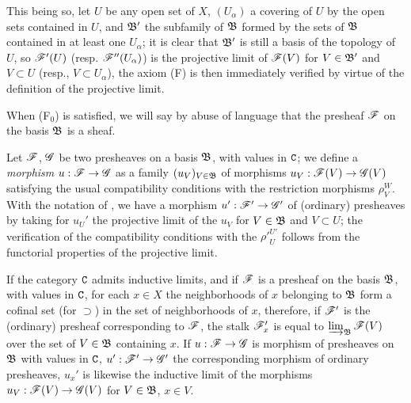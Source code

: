 \begin{env}[3.2.2]
This being so, let $U$ be any open set of $X$, $(U_\alpha)$ a covering of $U$ by
the open sets contained in $U$, and $\mathfrak{B}'$ the subfamily of
$\mathfrak{B}$ formed by the sets
of $\mathfrak{B}$ contained in at least one $U_\alpha$; it is clear that
$\mathfrak{B}'$ is still a basis of the topology of $U$, so $\mathscr{F}'(U)$
(resp. $\mathscr{F}''(U_\alpha)$) is the projective limit of $\mathscr{F}(V)$ for
$V\in\mathfrak{B}'$ and $V\subset U$ (resp., $V\subset U_\alpha$), the axiom (F)
is then immediately verified by virtue of the definition of the projective
limit.

When (F$_0$) is satisfied, we will say by abuse of language that the presheaf
$\mathscr{F}$ on the basis $\mathfrak{B}$ is a sheaf.
\end{env}

\begin{env}[3.2.3]
\label{0.3.2.3}
Let $\mathscr{F}$, $\mathscr{G}$ be two presheaves on a basis $\mathfrak{B}$, with values
in $\mathtt{C}$; we define a \emph{morphism} $u:\sh{F}\to\sh{G}$ as a family
$(u_V)_{V\in\mathfrak{B}}$ of morphisms $u_V:\sh{F}(V)\to\sh{G}(V)$ satisfying
the usual compatibility conditions with the restriction morphisms $\rho_V^W$.
With the notation of , we have a morphism
$u':\sh{F}'\to\sh{G}'$ of (ordinary) presheaves by taking for $u_U'$ the
projective limit of the $u_V$ for $V\in\mathfrak{B}$ and $V\subset U$; the
verification of the compatibility conditions with the ${\rho'}_U^{U'}$ follows
from the functorial properties of the projective limit.
\end{env}

\begin{env}[3.2.4]
\label{0.3.2.4}
If the category $\mathtt{C}$ admits inductive limits, and if $\mathscr{F}$ is a presheaf on
the basis $\mathfrak{B}$, with values in $\mathtt{C}$, for each $x\in X$ the
neighborhoods of $x$ belonging to $\mathfrak{B}$ form a cofinal set
(for $\supset$) in the set of neighborhoods of $x$, therefore, if $\mathscr{F}'$ is
the (ordinary) presheaf corresponding to $\mathscr{F}$, the stalk $\mathscr{F}_x'$ is
equal to $\varinjlim_{\mathfrak{B}}\mathscr{F}(V)$ over the set of $V\in\mathfrak{B}$
containing $x$. If $u:\sh{F}\to\sh{G}$ is morphism of presheaves on
$\mathfrak{B}$ with values in $\mathtt{C}$, $u':\sh{F}'\to\sh{G}'$ the corresponding
morphism of ordinary presheaves, $u_x'$ is likewise the inductive limit of the
morphisms $u_V:\sh{F}(V)\to\sh{G}(V)$ for $V\in\mathfrak{B}$, $x\in V$.
\end{env}

